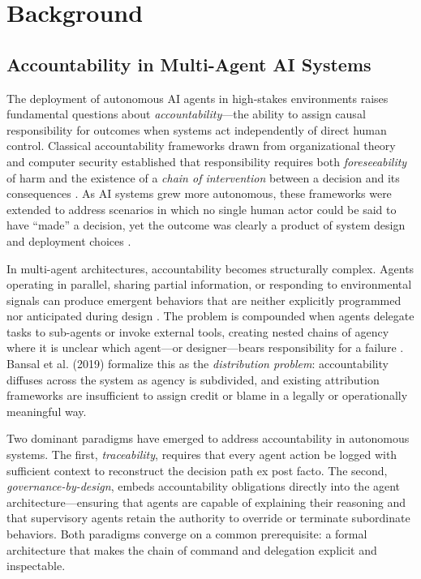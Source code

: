 \section{Background}

\subsection{Accountability in Multi-Agent AI Systems}

The deployment of autonomous AI agents in high-stakes environments raises fundamental questions about \emph{accountability}—the ability to assign causal responsibility for outcomes when systems act independently of direct human control. Classical accountability frameworks drawn from organizational theory and computer security established that responsibility requires both \emph{foreseeability} of harm and the existence of a \emph{chain of intervention} between a decision and its consequences \cite{dijkstra1982}. As AI systems grew more autonomous, these frameworks were extended to address scenarios in which no single human actor could be said to have ``made'' a decision, yet the outcome was clearly a product of system design and deployment choices \cite{tristr81}.

In multi-agent architectures, accountability becomes structurally complex. Agents operating in parallel, sharing partial information, or responding to environmental signals can produce emergent behaviors that are neither explicitly programmed nor anticipated during design \cite{wiener1948}. The problem is compounded when agents delegate tasks to sub-agents or invoke external tools, creating nested chains of agency where it is unclear which agent—or designer—bears responsibility for a failure \cite{bansal2019}. Bansal et al. (2019) formalize this as the \emph{distribution problem}: accountability diffuses across the system as agency is subdivided, and existing attribution frameworks are insufficient to assign credit or blame in a legally or operationally meaningful way.

Two dominant paradigms have emerged to address accountability in autonomous systems. The first, \emph{traceability}, requires that every agent action be logged with sufficient context to reconstruct the decision path ex post facto. The second, \emph{governance-by-design}, embeds accountability obligations directly into the agent architecture—ensuring that agents are capable of explaining their reasoning and that supervisory agents retain the authority to override or terminate subordinate behaviors. Both paradigms converge on a common prerequisite: a formal architecture that makes the chain of command and delegation explicit and inspectable.

